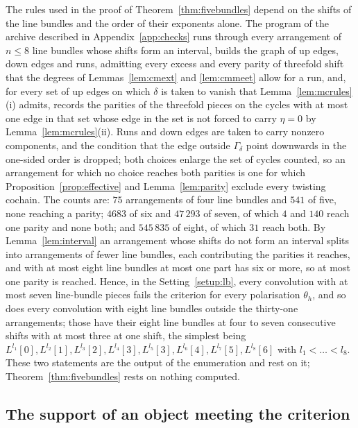 \begin{remark}\label{rem:sevenbundles}
The rules used in the proof of Theorem~\ref{thm:fivebundles} depend on the shifts of the line bundles and the order of their exponents alone. The program of the archive described in Appendix~\ref{app:checks} runs through every arrangement of $n\le8$ line bundles whose shifts form an interval, builds the graph of up edges, down edges and runs, admitting every excess and every parity of threefold shift that the degrees of Lemmas~\ref{lem:cmext} and \ref{lem:cmmeet} allow for a run, and, for every set of up edges on which $\delta$ is taken to vanish that Lemma~\ref{lem:mcrules}(i) admits, records the parities of the threefold pieces on the cycles with at most one edge in that set whose edge in the set is not forced to carry $\eta=0$ by Lemma~\ref{lem:mcrules}(ii). Runs and down edges are taken to carry nonzero components, and the condition that the edge outside $\Gamma_{\delta}$ point downwards in the one-sided order is dropped; both choices enlarge the set of cycles counted, so an arrangement for which no choice reaches both parities is one for which Proposition~\ref{prop:effective} and Lemma~\ref{lem:parity} exclude every twisting cochain. The counts are: $75$ arrangements of four line bundles and $541$ of five, none reaching a parity; $4683$ of six and $47\,293$ of seven, of which $4$ and $140$ reach one parity and none both; and $545\,835$ of eight, of which $31$ reach both. By Lemma~\ref{lem:interval} an arrangement whose shifts do not form an interval splits into arrangements of fewer line bundles, each contributing the parities it reaches, and with at most eight line bundles at most one part has six or more, so at most one parity is reached. Hence, in the Setting~\ref{setup:lb}, every convolution with at most seven line-bundle pieces fails the criterion for every polarisation $\theta_{h}$, and so does every convolution with eight line bundles outside the thirty-one arrangements; those have their eight line bundles at four to seven consecutive shifts with at most three at one shift, the simplest being $L^{l_{1}}[0],L^{l_{2}}[1],L^{l_{3}}[2],L^{l_{4}}[3],L^{l_{5}}[3],L^{l_{6}}[4],L^{l_{7}}[5],L^{l_{8}}[6]$ with $l_{1}<\dots<l_{8}$. These two statements are the output of the enumeration and rest on it; Theorem~\ref{thm:fivebundles} rests on nothing computed.
\end{remark}

\subsection{The support of an object meeting the criterion}\label{ssec:supports}

